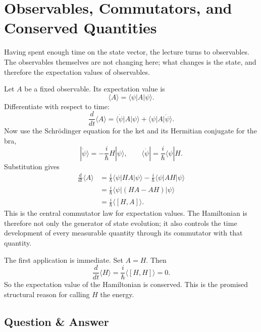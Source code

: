 \section{Observables, Commutators, and Conserved Quantities}

Having spent enough time on the state vector, the lecture turns to observables. The observables themselves are not changing here; what changes is the state, and therefore the expectation values of observables.

Let \(A\) be a fixed observable. Its expectation value is
\begin{equation}
\langle A\rangle = \langle \psi|A|\psi\rangle.
\end{equation}
Differentiate with respect to time:
\begin{equation}
\frac{d}{dt}\langle A\rangle
=
\langle \dot\psi|A|\psi\rangle + \langle \psi|A|\dot\psi\rangle.
\end{equation}
Now use the Schrödinger equation for the ket and its Hermitian conjugate for the bra,
\begin{equation}
|\dot\psi\rangle = -\frac{i}{\hbar}H|\psi\rangle,
\qquad
\langle \dot\psi| = \frac{i}{\hbar}\langle \psi|H.
\end{equation}
Substitution gives
\begin{align}
\frac{d}{dt}\langle A\rangle
&=
\frac{i}{\hbar}\langle \psi|HA|\psi\rangle
-
\frac{i}{\hbar}\langle \psi|AH|\psi\rangle \\
&=
\frac{i}{\hbar}\langle \psi|(HA-AH)|\psi\rangle \\
&=
\frac{i}{\hbar}\langle [H,A]\rangle.
\end{align}
This is the central commutator law for expectation values. The Hamiltonian is therefore not only the generator of state evolution; it also controls the time development of every measurable quantity through its commutator with that quantity.

The first application is immediate. Set \(A=H\). Then
\begin{equation}
\frac{d}{dt}\langle H\rangle
=
\frac{i}{\hbar}\langle [H,H]\rangle
=
0.
\end{equation}
So the expectation value of the Hamiltonian is conserved. This is the promised structural reason for calling \(H\) the energy.

\subsection{Question \& Answer}

